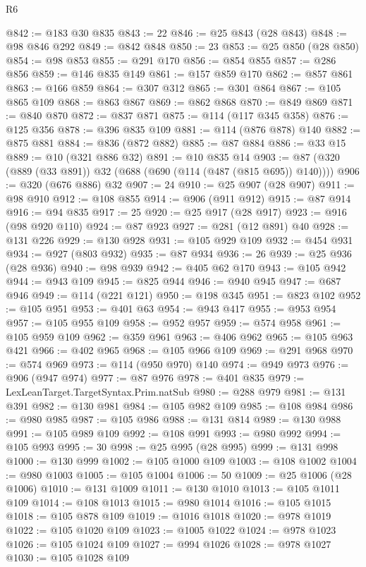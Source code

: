 \begin{lexlean}{R6}
\begin{coremodule}
{{{{{{{{{{{{{{{{{{{{{{{{{{{{{{{{{{{{{{{{{{{{{{{{{{{{{{{{{{{{{@842 := @183 @30 @835
@843 := 22
@846 := @25 @843 (@28 @843)
@848 := @98 @846 @292
@849 := @842 @848
@850 := 23
@853 := @25 @850 (@28 @850)
@854 := @98 @853
@855 := @291 @170
@856 := @854 @855
@857 := @286 @856
@859 := @146 @835 @149
@861 := @157 @859 @170
@862 := @857 @861
@863 := @166 @859
@864 := @307 @312
@865 := @301 @864
@867 := @105 @865 @109
@868 := @863 @867
@869 := @862 @868
@870 := @849 @869
@871 := @840 @870
@872 := @837 @871
@875 := @114 (@117 @345 @358)
@876 := @125 @356
@878 := @396 @835 @109
@881 := @114 (@876 @878) @140
@882 := @875 @881
@884 := @836 (@872 @882)
@885 := @87 @884
@886 := @33 @15
@889 := @10 (@321 @886 @32)
@891 := @10 @835 @14
@903 := @87 (@320 (@889 (@33 @891)) @32 (@688 (@690 (@114 (@487 (@815 @695)) @140))))
@906 := @320 (@676 @886) @32
@907 := 24
@910 := @25 @907 (@28 @907)
@911 := @98 @910
@912 := @108 @855
@914 := @906 (@911 @912)
@915 := @87 @914
@916 := @94 @835
@917 := 25
@920 := @25 @917 (@28 @917)
@923 := @916 (@98 @920 @110)
@924 := @87 @923
@927 := @281 (@12 @891) @40
@928 := @131 @226
@929 := @130 @928
@931 := @105 @929 @109
@932 := @454 @931
@934 := @927 (@803 @932)
@935 := @87 @934
@936 := 26
@939 := @25 @936 (@28 @936)
@940 := @98 @939
@942 := @405 @62 @170
@943 := @105 @942
@944 := @943 @109
@945 := @825 @944
@946 := @940 @945
@947 := @687 @946
@949 := @114 (@221 @121)
@950 := @198 @345
@951 := @823 @102
@952 := @105 @951
@953 := @401 @63
@954 := @943 @417
@955 := @953 @954
@957 := @105 @955 @109
@958 := @952 @957
@959 := @574 @958
@961 := @105 @959 @109
@962 := @359 @961
@963 := @406 @962
@965 := @105 @963 @421
@966 := @402 @965
@968 := @105 @966 @109
@969 := @291 @968
@970 := @574 @969
@973 := @114 (@950 @970) @140
@974 := @949 @973
@976 := @906 (@947 @974)
@977 := @87 @976
@978 := @401 @835
@979 := LexLeanTarget.TargetSyntax.Prim.natSub
@980 := @288 @979
@981 := @131 @391
@982 := @130 @981
@984 := @105 @982 @109
@985 := @108 @984
@986 := @980 @985
@987 := @105 @986
@988 := @131 @814
@989 := @130 @988
@991 := @105 @989 @109
@992 := @108 @991
@993 := @980 @992
@994 := @105 @993
@995 := 30
@998 := @25 @995 (@28 @995)
@999 := @131 @998
@1000 := @130 @999
@1002 := @105 @1000 @109
@1003 := @108 @1002
@1004 := @980 @1003
@1005 := @105 @1004
@1006 := 50
@1009 := @25 @1006 (@28 @1006)
@1010 := @131 @1009
@1011 := @130 @1010
@1013 := @105 @1011 @109
@1014 := @108 @1013
@1015 := @980 @1014
@1016 := @105 @1015
@1018 := @105 @878 @109
@1019 := @1016 @1018
@1020 := @978 @1019
@1022 := @105 @1020 @109
@1023 := @1005 @1022
@1024 := @978 @1023
@1026 := @105 @1024 @109
@1027 := @994 @1026
@1028 := @978 @1027
@1030 := @105 @1028 @109
}}}}}}}}}}}}}}}}}}}}}}}}}}}}}}}}}}}}}}}}}}}}}}}}}}}}}}}}}}}}}
\end{coremodule}
\end{lexlean}
